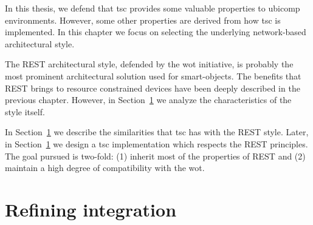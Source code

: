 In this thesis, we defend that \acf{tsc} provides some valuable properties to \ac{ubicomp} environments. %
However, some other properties are derived from how \ac{tsc} is implemented.
In this chapter we focus on selecting the underlying network-based architectural style.


The REST architectural style, defended by the \acf{wot} initiative, is probably the most prominent architectural solution used for smart-objects. %
The benefits that REST brings to resource constrained devices have been deeply described in the previous chapter.
However, in Section~\ref{} we analyze the characteristics of the style itself.

In Section~\ref{} we describe the similarities that \ac{tsc} has with the REST style.
Later, in Section~\ref{} we design a \ac{tsc} implementation which respects the REST principles.
The goal pursued is two-fold: (1) inherit most of the properties of REST and (2) maintain a high degree of compatibility with the \ac{wot}.







\section{Refining integration} %


